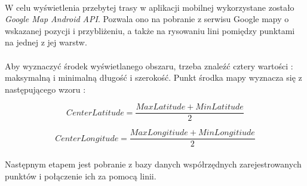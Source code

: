 \paragraph{} %


W celu wyświetlenia przebytej trasy w aplikacji mobilnej wykorzystane zostało \textit{Google Map Android API}. Pozwala ono na pobranie z serwisu Google mapy o wskazanej pozycji i przybliżeniu, a także na rysowaniu lini pomiędzy punktami na jednej z jej warstw. 

\paragraph{}
Aby wyznaczyć środek wyświetlanego obszaru, trzeba znaleźć cztery wartości : maksymalną i minimalną długość i szerokość. Punkt środka mapy wyznacza się z następującego wzoru :

\begin{equation}
	CenterLatitude = \frac{MaxLatitude + MinLatitude}{2}
\end{equation}

\begin{equation}
		CenterLongitude = \frac{MaxLongitiude + MinLongitiude}{2}
\end{equation}

\paragraph{} %
\label{par:}
Następnym etapem jest pobranie z bazy danych współrzędnych zarejestrowanych punktów i połączenie ich za pomocą linii.
